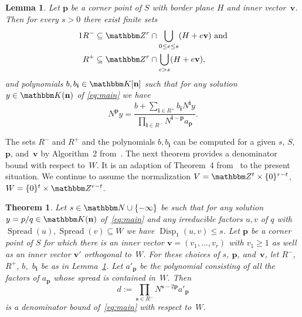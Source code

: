 \documentclass[a4paper]{sig-alternate}
\let\set\mathbbm
\def\vec#1{\mathbf{#1}}
\def\spread{\operatorname{Spread}}
\def\disp{\operatorname{Disp}}
\newtheorem{theorem}{Theorem}
\newtheorem{lemma}{Lemma}
\begin{document}
\begin{lemma}\label{lemma:1}
  Let $\vec p$ be a corner point of $S$ with border plane $H$ and inner vector~$\vec v$.
  Then for every $s>0$ there exist finite sets
  \begin{alignat*}1
    &R^-\subseteq\set Z^r\cap\bigcup_{0\leq e\leq s}(H+e\vec v)\text{ and}\\
    &R^+\subseteq\set Z^r\cap\bigcup_{e>s}(H+e\vec v),
  \end{alignat*}
  and polynomials $b,b_{\vec i}\in\set K[\vec n]$ such that for any solution $y\in\set K(\vec n)$
  of \eqref{eq:main} we have
  \begin{equation}\label{eq:reduced}
    N^{\vec p}y=\frac{b+\sum_{\vec i\in R^+}b_{\vec i}N^{\vec i}y}
                    {\prod_{\vec i\in R^-}N^{\vec i-\vec p} a_{\vec p}}.
  \end{equation}
\end{lemma}

The sets $R^-$ and $R^+$ and the polynomials $b,b_{\vec i}$ can be computed for a
given $s$, $S$, $\vec p$, and~$\vec v$ by Algorithm~2 from~\cite{kauers10b}. The next theorem provides
a denominator bound with respect to~$W$. It is an adaption of Theorem~4 from~\cite{kauers10b}
to the present situation. We continue to assume the normalization $V=\set Z^t\times\{0\}^{r-t}$,
$W=\{0\}^t\times\set Z^{r-t}$.

\begin{theorem}\label{thm:db}
  Let $s\in\set N\cup\{-\infty\}$ be such that for any solution $y=p/q\in\set K(\vec n)$
  of~\eqref{eq:main} and any irreducible factors $u,v$ of $q$ with $\spread(u),\spread(v)\subseteq W$
  we have $\disp_1(u,v)\leq s$.
  Let $\vec p$ be a corner point of $S$ for which there is an inner vector $\vec v=(v_1,\dots,v_r)$
  with $v_1\geq1$ as well as an inner vector $\vec v'$ orthogonal to~$W$.
  For these choices of $s$, $\vec p$, and~$\vec v$, let $R^-$, $R^+$, $b$,~$b_{\vec i}$ be as in
  Lemma~\ref{lemma:1}.
  Let $a'_{\vec p}$ be the polynomial consisting of all the factors of $a_{\vec p}$
  whose spread is contained in~$W$.
  Then
  \begin{equation}\label{Equ:DenBoundPlance}
    d:=\prod_{\vec s\in R^-}N^{\vec s-2\vec p}a'_{\vec p}
  \end{equation}
  is a denominator bound of~\eqref{eq:main} with respect to~$W$.
\end{theorem}
\end{document}
